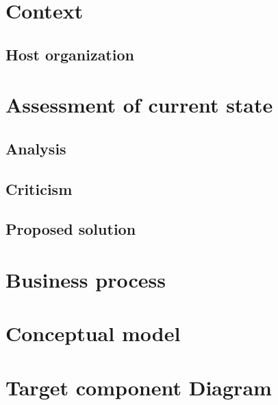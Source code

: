 \documentclass[11pt]{article}
\begin{document}
    \section{Context}\label{sec:context}

    \subsection{Host organization}\label{subsec:host-organization}
    

    \newpage

    \section{Assessment of current state}\label{sec:assessment-of-current-state}
    \subsection{Analysis}\label{subsec:analysis}
    

    \subsection{Criticism}\label{subsec:criticism}
    

    \subsection{Proposed solution}\label{subsec:solution}
    

    \newpage

    \section{Business process}\label{sec:business-process}
    

    \newpage

    \section{Conceptual model}\label{sec:conceptual-model}
    

    \section{Target component Diagram}\label{sec:target-comp}
    
\end{document}
